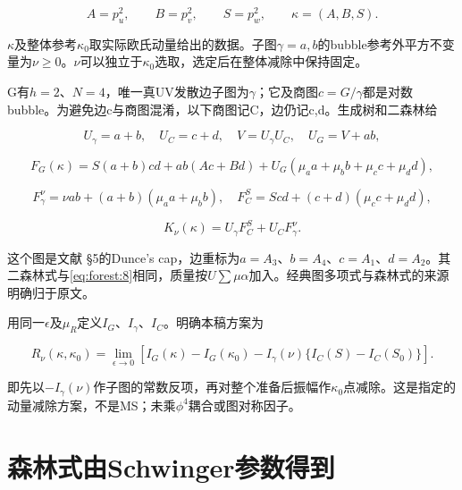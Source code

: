 \documentclass[11pt,a4paper,oneside]{ctexrep}
\theoremstyle{cnplain}
\theoremstyle{definition}
\theoremstyle{remark}
\begin{document}
\begin{equation}
A=p_u^2,\qquad B=p_v^2,\qquad S=p_w^2,
 \qquad \kappa=(A,B,S).
\end{equation}

\(\kappa \)及整体参考\(\kappa _0\)取实际欧氏动量给出的数据。子图\(\gamma ={a,b}\)的bubble参考外平方不变量为\(\nu \ge 0\)。\(\nu \)可以独立于\(\kappa _0\)选取，选定后在整体减除中保持固定。

G有\(h=2\)、\(N=4\)，唯一真UV发散边子图为\(\gamma \)；它及商图\(c=G/\gamma \)都是对数bubble。为避免边c与商图混淆，以下商图记C，边仍记c,d。生成树和二森林给

\begin{equation}
U_\gamma=a+b,\quad U_C=c+d,\quad V=U_\gamma U_C,
 \quad U_G=V+ab,                                                \label{eq:forest:7}
\end{equation}

\begin{equation}
F_G(\kappa)=S(a+b)cd+ab(Ac+Bd)
                +U_G(\mu_a a+\mu_b b+\mu_c c+\mu_d d),           \label{eq:forest:8}
\end{equation}

\begin{equation}
F_\gamma^\nu=\nu ab+(a+b)(\mu_a a+\mu_b b),\quad
 F_C^S=S cd+(c+d)(\mu_c c+\mu_d d),
\end{equation}

\begin{equation}
K_\nu(\kappa)=U_\gamma F_C^S+U_C F_\gamma^\nu.                  \label{eq:forest:9}
\end{equation}

这个图是文献\cite{bk2012} §5的Dunce's cap，边重标为\(a=A_3\)、\(b=A_4\)、\(c=A_1\)、\(d=A_2\)。其二森林式与\eqref{eq:forest:8}相同，质量按\(U\sum \mu \alpha \)加入。经典图多项式与森林式的来源明确归于原文。

用同一\(\epsilon \)及\(\mu _R\)定义\(I_G\)、\(I_\gamma \)、\(I_C\)。明确本稿方案为

\begin{equation}
R_\nu(\kappa,\kappa_0)=\lim_{\epsilon\to0}
 \left[I_G(\kappa)-I_G(\kappa_0)
 -I_\gamma(\nu)\{I_C(S)-I_C(S_0)\}\right].                       \label{eq:forest:10}
\end{equation}

即先以\(- I_\gamma (\nu )\)作子图的常数反项，再对整个准备后振幅作\(\kappa _0\)点减除。这是指定的动量减除方案，不是MS；未乘\(\phi ^{4}\)耦合或图对称因子。

\section{森林式由Schwinger参数得到}\label{sec:forest:3}
\end{document}
